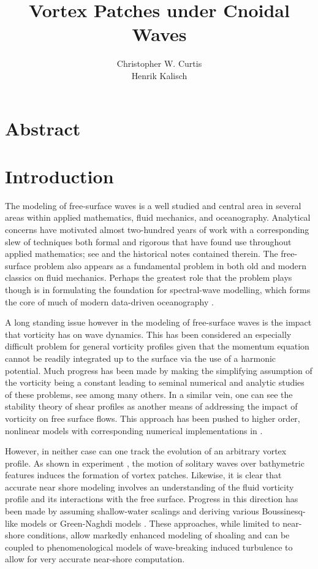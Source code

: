 \documentclass[a4paper,11pt]{article}
\title{Vortex Patches under Cnoidal Waves}
\author{Christopher W. Curtis\\
Henrik Kalisch}
\date{}
\begin{document}
\maketitle
\section*{Abstract}

\section{Introduction}
The modeling of free-surface waves is a well studied and central area in several areas within applied mathematics, fluid mechanics, and oceanography.  Analytical concerns have motivated almost two-hundred years of work with a corresponding slew of techniques both formal and rigorous that have found use throughout applied mathematics; see \cite{constantin} and the historical notes contained therein.  The free-surface problem also appears as a fundamental problem in both old \cite{lamb} and modern \cite{kundu} classics on fluid mechanics. Perhaps the greatest role that the problem plays though is in formulating the foundation for spectral-wave modelling, which forms the core of much of modern data-driven oceanography \cite{holthuijsen}.

A long standing issue however in the modeling of free-surface waves is the impact that vorticity has on wave dynamics.  This has been considered an especially difficult problem for general vorticity profiles given that the momentum equation cannot be readily integrated up to the surface via the use of a harmonic potential.  Much progress has been made by making the simplifying assumption of the vorticity being a constant leading to seminal numerical and analytic studies of these problems, see \cite{constantin,pullin1,simmen,dasilva} among many others.  In a similar vein, one can see the stability theory of shear profiles \cite{craik2,craik3,drazen,phillips1} as another means of addressing the impact of vorticity on free surface flows.  This approach has been pushed to higher order, nonlinear models with corresponding numerical implementations in \cite{nwogu2}.

However, in neither case can one track the evolution of an arbitrary vortex profile.  As shown in experiment \cite{liu1,liu2,lin}, the motion of solitary waves over bathymetric features induces the formation of vortex patches.  Likewise, it is clear that accurate near shore modeling involves an understanding of the fluid vorticity profile and its interactions with the free surface.  Progress in this direction has been made by assuming shallow-water scalings and deriving various Boussinesq-like models \cite{nwogu1,chen,zhang} or Green-Naghdi models \cite{Lannes2014_1,Lannes2014_2,Lannes2016_1}.  These approaches, while limited to near-shore conditions, allow markedly enhanced modeling of shoaling and can be coupled to phenomenological models of wave-breaking induced turbulence to allow for very accurate near-shore computation.  
\end{document}
